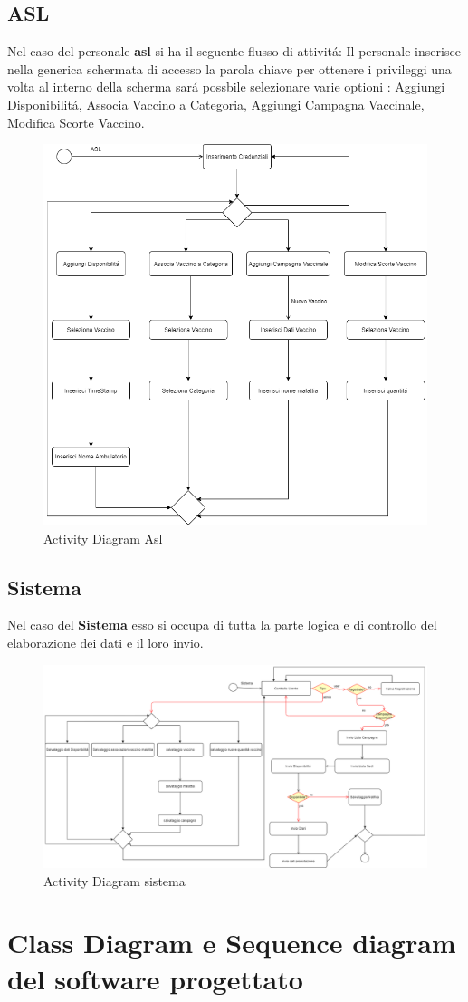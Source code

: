 \documentclass[a4paper,12pt,openany,oneside]{book}
\begin{document}
\subsection{ASL}
Nel caso del personale \textbf{asl} si ha il seguente flusso di attivitá: Il personale inserisce nella generica schermata di accesso la parola chiave per ottenere i privileggi una volta al interno della scherma sará possbile selezionare varie optioni : Aggiungi Disponibilitá, Associa Vaccino a Categoria, Aggiungi Campagna Vaccinale, Modifica Scorte Vaccino.\\
\begin{figure}[h] 
\centering
\includegraphics[width=0.5\columnwidth]{Activity Diagram ASL.png} 
\caption{Activity Diagram Asl} 
\end{figure}
\subsection{Sistema}
Nel caso del \textbf{Sistema} esso si occupa di tutta la parte logica e di controllo del elaborazione dei dati e il loro invio.
\begin{figure}[h] 
\centering
\includegraphics[width=0.8\columnwidth]{Activity Diagram Sistema.png} 
\caption{Activity Diagram sistema} 
\end{figure}
\newpage
\section{Class Diagram e Sequence diagram del software progettato}
\end{document}
